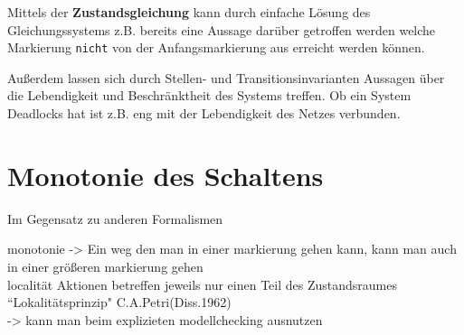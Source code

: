 Mittels der \textbf{Zustandsgleichung} kann durch einfache Lösung des Gleichungssystems z.B. bereits eine Aussage darüber getroffen werden welche Markierung \texttt{nicht} von der Anfangsmarkierung aus erreicht werden können.

Außerdem lassen sich durch Stellen- und Transitionsinvarianten Aussagen über die Lebendigkeit und Beschränktheit des Systems treffen.
Ob ein System Deadlocks hat ist z.B. eng mit der Lebendigkeit des Netzes verbunden.

\section{Monotonie des Schaltens}
Im Gegensatz zu anderen Formalismen 


monotonie -> Ein weg den man in einer markierung gehen kann, kann man auch in einer größeren markierung gehen\\
localität Aktionen betreffen jeweils nur einen Teil des Zustandsraumes “Lokalitätsprinzip" C.A.Petri(Diss.1962)\\
-> kann man beim explizieten modellchecking ausnutzen\\
